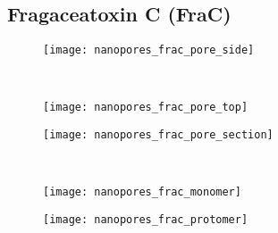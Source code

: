 \subsection{Fragaceatoxin C (FraC)}
%
\label{sec:np:frac}
%

\begin{figure*}[p]
  \centering
  \medskip
  \begin{minipage}[t]{58mm}
    \begin{subfigure}[t]{58mm}
      \centering
      \caption{}\vspace{-8.5mm}\hspace{1.5mm}\label{fig:nanopores_frac_pore_side}
      \texttt{[image: nanopores\_frac\_pore\_side]}
    \end{subfigure}
    \vspace{5mm} \\
    \begin{subfigure}[t]{58mm}
      \centering
      \caption{}\vspace{-8.5mm}\hspace{1.5mm}\label{fig:nanopores_frac_pore_top}
      \texttt{[image: nanopores\_frac\_pore\_top]}
    \end{subfigure}
  \end{minipage}
  \begin{minipage}[t]{58mm}
    \begin{subfigure}[t]{58mm}
      \centering
      \caption{}\vspace{-8.5mm}\hspace{1.5mm}\label{fig:nanopores_frac_pore_section}
      \texttt{[image: nanopores\_frac\_pore\_section]}
    \end{subfigure}
    \vspace{5mm} \\
    \begin{subfigure}[t]{28mm}
      \caption{}\vspace{-8.5mm}\hspace{1.5mm}\label{fig:nanopores_frac_monomer}
      \texttt{[image: nanopores\_frac\_monomer]}
    \end{subfigure}
    \begin{subfigure}[t]{28mm}
      \centering
      \caption{}\vspace{-8.5mm}\hspace{1.5mm}\label{fig:nanopores_frac_protomer}
      \texttt{[image: nanopores\_frac\_protomer]}
    \end{subfigure}
  \end{minipage}

\end{figure*}
